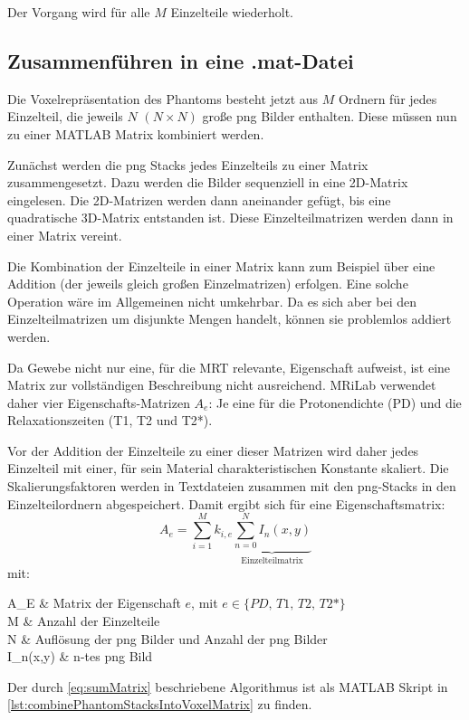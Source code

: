 Der Vorgang wird für alle $M$ Einzelteile wiederholt.

\subsection{Zusammenführen in eine .mat-Datei}
Die Voxelrepräsentation des Phantoms besteht jetzt aus $M$ Ordnern für jedes Einzelteil, die jeweils $N$ $(N \times N)$ große png Bilder enthalten. Diese müssen nun zu einer MATLAB Matrix kombiniert werden.

Zunächst werden die png Stacks jedes Einzelteils zu einer Matrix zusammengesetzt. Dazu werden die Bilder sequenziell in eine 2D-Matrix eingelesen. Die 2D-Matrizen werden dann aneinander gefügt, bis eine quadratische 3D-Matrix entstanden ist. Diese Einzelteilmatrizen werden dann in einer Matrix vereint.

Die Kombination der Einzelteile in einer Matrix kann zum Beispiel über eine Addition (der jeweils gleich großen Einzelmatrizen) erfolgen. Eine solche Operation wäre im Allgemeinen nicht umkehrbar. Da es sich aber bei den Einzelteilmatrizen um disjunkte Mengen handelt, können sie problemlos addiert werden.

Da Gewebe nicht nur eine, für die MRT relevante, Eigenschaft aufweist, ist eine Matrix zur vollständigen Beschreibung nicht ausreichend. MRiLab verwendet daher vier Eigenschafts-Matrizen $A_e$: Je eine für die Protonendichte (PD) und die Relaxationszeiten (T1, T2 und T2*).

Vor der Addition der Einzelteile zu einer dieser Matrizen wird daher jedes Einzelteil mit einer, für sein Material charakteristischen Konstante skaliert. Die Skalierungsfaktoren werden in Textdateien zusammen mit den png-Stacks in den Einzelteilordnern abgespeichert. Damit ergibt sich für eine Eigenschaftsmatrix:
\begin{equation}
\label{eq:sumMatrix}
	A_e=\sum_{i=1}^{M} k_{i,e} \underbrace{\sum_{n=0}^{N} I_n(x,y)}_\text{Einzelteilmatrix}
\end{equation}
mit:
\begin{with*}
	A_E & Matrix der Eigenschaft $e$, mit $e \in \{PD,\, T1,\, T2,\, T2\text{*}\}$ \\
	M & Anzahl der Einzelteile \\
	N & Auflösung der png Bilder und Anzahl der png Bilder \\
	I_n(x,y) & n-tes png Bild \\
\end{with*}

Der durch \autoref{eq:sumMatrix} beschriebene Algorithmus ist als MATLAB Skript in \autoref{lst:combinePhantomStacksIntoVoxelMatrix} zu finden.











